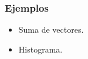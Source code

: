 \begin{frame}[fragile]
	\frametitle{Ejemplos}
	\begin{itemize}
		\item Suma de vectores.
		\item Histograma.
	\end{itemize}
\end{frame}
